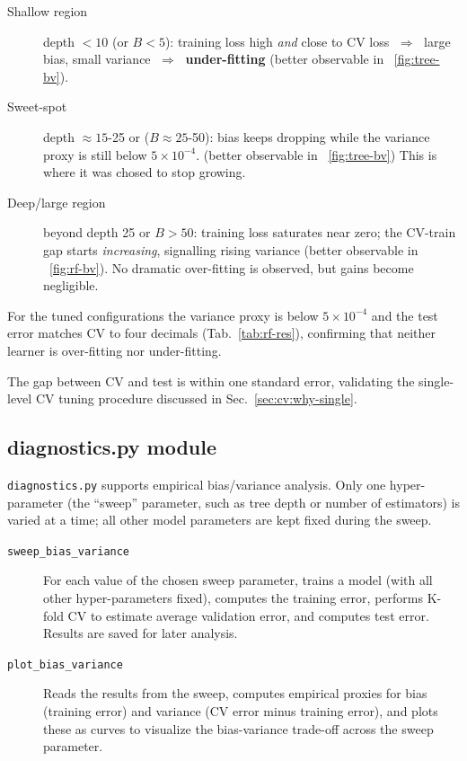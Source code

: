 \documentclass[12pt]{report}
\begin{document}
\begin{description}
  \item[Shallow region]  
        depth $<\!10$ (or $B<\!5$): training loss high \emph{and} close to
        CV loss $\;\Rightarrow\;$ large bias, small variance
        $\;\Rightarrow\;$ \textbf{under-fitting} 
        (better observable in ~\ref{fig:tree-bv}).
  \item[Sweet-spot]  
        depth $\approx15$-25 or ($B\approx25$-50): bias keeps dropping while
        the variance proxy is still below $5\!\times\!10^{-4}$.
        (better observable in ~\ref{fig:tree-bv})
        This is where it was chosed to stop growing.
  \item[Deep/large region]  
        beyond depth 25 or $B>50$: training loss saturates near zero; the
        CV-train gap starts \emph{increasing}, signalling rising variance 
        (better observable in ~\ref{fig:rf-bv}).
        No dramatic over-fitting is observed, but gains become negligible.
\end{description}

For the tuned configurations the variance proxy is below $5\times10^{-4}$ and
the test error matches CV to four decimals (Tab.~\ref{tab:rf-res}), confirming
that neither learner is over-fitting nor under-fitting.

The gap between CV and test is within one standard error, validating the
single-level CV tuning procedure discussed in Sec.~\ref{sec:cv:why-single}.

\subsection{diagnostics.py module}
\texttt{diagnostics.py} supports empirical bias/variance analysis. Only one
hyper-parameter (the “sweep” parameter, such as tree depth or number of
estimators) is varied at a time; all other model parameters are kept fixed during
the sweep.

\begin{description}
  \item[\texttt{sweep\_bias\_variance}]
        For each value of the chosen sweep parameter, trains a model (with all
        other hyper-parameters fixed), computes the training error, performs K-fold
        CV to estimate average validation error, and computes test error. Results
        are saved for later analysis.
  \item[\texttt{plot\_bias\_variance}]
        Reads the results from the sweep, computes empirical proxies for bias
        (training error) and variance (CV error minus training error), and plots
        these as curves to visualize the bias-variance trade-off across the sweep
        parameter.
\end{description}
\end{document}
